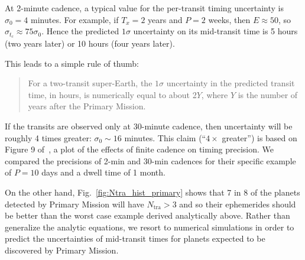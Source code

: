 At 2-minute cadence, a typical value for the per-transit timing uncertainty is 
$\sigma_0 = 4$ minutes.
For example, if $T_x = 2$ years and $P = 2$ weeks, then $E \approx 50$, so 
$\sigma_{t_c}\approx 75\sigma_0$.
Hence the predicted $1\sigma$ uncertainty on its mid-transit time 
is 5 hours (two years later) or 10 hours (four years later).
 
 This leads to a simple rule of thumb: 
\begin{quotation}
  For a two-transit super-Earth, the $1\sigma$ uncertainty in the predicted 
  transit time, in hours, is numerically equal to about
  2$Y$, where $Y$ is the number of years after the Primary Mission.
\end{quotation}
If the transits are observed only at 30-minute cadence, then uncertainty will be roughly 4 times greater: $\sigma_0 \sim 16$ minutes. 
This claim (``$4\times$ greater'') is based on Figure 9 of~\citep{price_transit_2014}, a plot of the effects of finite cadence on timing precision. %
We compared the precisions of 2-min and 30-min cadences for their specific example of $P=10$ days and a dwell time of 1 month.

On the other hand, Fig.~\ref{fig:Ntra_hist_primary} shows that 7 in 8 of the 
planets detected by \tesss Primary Mission will have $N_\mathrm{tra}>3$ and so 
their ephemerides should be better than the worst case example derived 
analytically above.
Rather than generalize the analytic equations, we resort to numerical simulations in order to predict the uncertainties of mid-transit times for planets expected to be discovered by \tesss Primary Mission.

